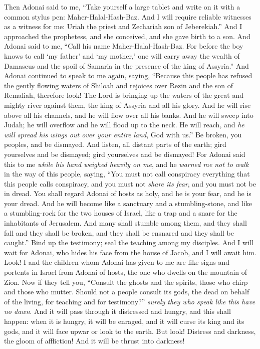 \begin{biblechapter} %
 Then Adonai said to me, “Take yourself a large tablet and write on it with a common stylus pen: Maher-Halal-Hash-Baz.
\verse And I will require reliable witnesses as a witness for me: Uriah the priest and Zechariah son of Jeberekiah.”
\verse And I approached the prophetess, and she conceived, and she gave birth to a son. And Adonai said to me, “Call his name Maher-Halal-Hash-Baz.
\verse For before the boy knows to call ‘my father’ and ‘my mother,’ one will carry away the wealth of Damascus and the spoil of Samaria in the presence of the king of Assyria.”
 And Adonai continued to speak to me again, saying,
\verse “Because this people has refused the gently flowing waters of Shiloah and rejoices over Rezin and the son of Remaliah,
\verse therefore look! The Lord is bringing up the waters of the great and mighty river against them, the king of Assyria and all his glory.
\verse And he will rise above all his channels, 
and he will flow over all his banks.
\verse And he will sweep into Judah; 
he will overflow and he will flood up to the neck. 
He will reach, and \textit{he will spread his wings out over your entire land}, God with us.”
\verse Be broken, you peoples, and be dismayed. 
And listen, all distant parts of the earth; 
gird yourselves and be dismayed; 
gird yourselves and be dismayed!
 For Adonai said this to me \textit{while his hand weighed heavily on me}, 
and he \textit{warned me not to walk} in the way of this people, saying,
\verse “You must not call conspiracy everything that this people calls conspiracy, 
and you must not \textit{share its fear}, and you must not be in dread.
\verse You shall regard Adonai of hosts as holy, 
and he is your fear, and he is your dread.
\verse And he will become like a sanctuary and a stumbling-stone, 
and like a stumbling-rock for the two houses of Israel, 
like a trap and a snare for the inhabitants of Jerusalem.
\verse And many shall stumble among them, 
and they shall fall and they shall be broken, 
and they shall be ensnared and they shall be caught.”
\verse Bind up the testimony; 
seal the teaching among my disciples.
\verse And I will wait for Adonai, 
who hides his face from the house of Jacob, 
and I will await him.
\verse Look! I and the children whom Adonai has given to me are like signs and portents in Israel from Adonai of hosts, the one who dwells on the mountain of Zion.
\verse Now if they tell you, “Consult the ghosts and the spirits, those who chirp and those who mutter. Should not a people consult its gods, the dead on behalf of the living,
\verse for teaching and for testimony?” \textit{surely they who speak like this have no dawn}.
\verse And it will pass through it distressed and hungry, and this shall happen: when it is hungry, it will be enraged, and it will curse its king and its gods, and it will face upwar
\verse or look to the earth. But look! Distress and darkness, the gloom of affliction! And it will be thrust into darkness!
\end{biblechapter}

